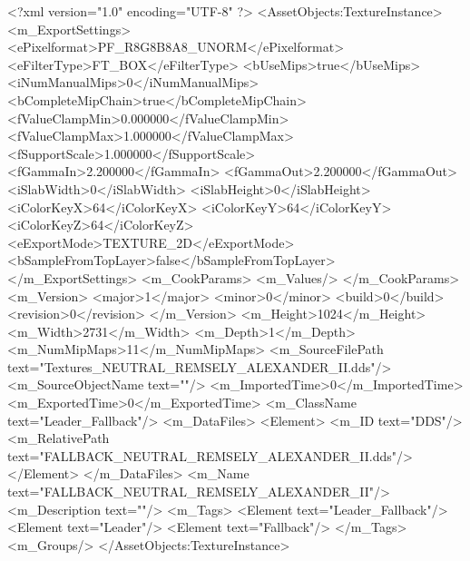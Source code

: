 <?xml version="1.0" encoding="UTF-8" ?>
<AssetObjects:TextureInstance>
	<m_ExportSettings>
		<ePixelformat>PF_R8G8B8A8_UNORM</ePixelformat>
		<eFilterType>FT_BOX</eFilterType>
		<bUseMips>true</bUseMips>
		<iNumManualMips>0</iNumManualMips>
		<bCompleteMipChain>true</bCompleteMipChain>
		<fValueClampMin>0.000000</fValueClampMin>
		<fValueClampMax>1.000000</fValueClampMax>
		<fSupportScale>1.000000</fSupportScale>
		<fGammaIn>2.200000</fGammaIn>
		<fGammaOut>2.200000</fGammaOut>
		<iSlabWidth>0</iSlabWidth>
		<iSlabHeight>0</iSlabHeight>
		<iColorKeyX>64</iColorKeyX>
		<iColorKeyY>64</iColorKeyY>
		<iColorKeyZ>64</iColorKeyZ>
		<eExportMode>TEXTURE_2D</eExportMode>
		<bSampleFromTopLayer>false</bSampleFromTopLayer>
	</m_ExportSettings>
	<m_CookParams>
		<m_Values/>
	</m_CookParams>
	<m_Version>
		<major>1</major>
		<minor>0</minor>
		<build>0</build>
		<revision>0</revision>
	</m_Version>
	<m_Height>1024</m_Height>
	<m_Width>2731</m_Width>
	<m_Depth>1</m_Depth>
	<m_NumMipMaps>11</m_NumMipMaps>
	<m_SourceFilePath text="Textures\FALLBACK_NEUTRAL_REMSELY_ALEXANDER_II.dds"/>
	<m_SourceObjectName text=""/>
	<m_ImportedTime>0</m_ImportedTime>
	<m_ExportedTime>0</m_ExportedTime>
	<m_ClassName text="Leader_Fallback"/>
	<m_DataFiles>
		<Element>
			<m_ID text="DDS"/>
			<m_RelativePath text="FALLBACK_NEUTRAL_REMSELY_ALEXANDER_II.dds"/>
		</Element>
	</m_DataFiles>
	<m_Name text="FALLBACK_NEUTRAL_REMSELY_ALEXANDER_II"/>
	<m_Description text=""/>
	<m_Tags>
		<Element text="Leader_Fallback"/>
		<Element text="Leader"/>
		<Element text="Fallback"/>
	</m_Tags>
	<m_Groups/>
</AssetObjects:TextureInstance>
